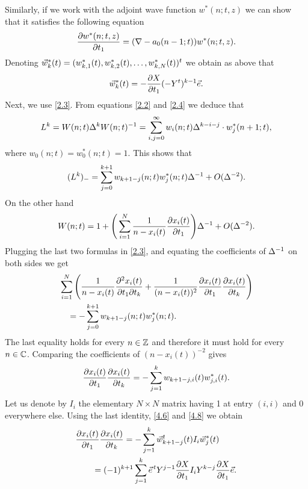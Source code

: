 \documentclass[11pt,reqno]{amsart}
\theoremstyle{definition}
\numberwithin{equation}{section}
\begin{document}
Similarly, if we work with the adjoint wave function $w^*(n;t,z)$ we 
can show that it satisfies the following equation
\begin{equation*}
\frac{\partial w^*(n;t,z)}{\partial t_1}=(\nabla-a_0(n-1;t))w^*(n;t,z).
\end{equation*}
Denoting ${\vec{w}}^*_k(t)=(w^*_{k,1}(t),w^*_{k,2}(t),\dots,w^*_{k,N}(t))^t$ we 
obtain as above that 
\begin{equation}                                             \label{4.8}
{\vec{w}}^*_k(t)=-\frac{\partial X}{\partial t_1}(-Y^t)^{k-1}{\vec{e}}.
\end{equation}
Next, we use \eqref{2.3}. From equations \eqref{2.2} and \eqref{2.4} we deduce 
that
\begin{equation*}
L^k=W(n;t)\Delta^k W(n;t)^{-1}
=\sum_{i,j=0}^{\infty}w_i(n;t)\Delta^{k-i-j}\cdot w^*_j(n+1;t),
\end{equation*}
where $w_0(n;t)=w^*_0(n;t)=1$. This shows that 
\begin{equation*}
(L^k)_-=\sum_{j=0}^{k+1}w_{k+1-j}(n;t)w^*_{j}(n;t)\Delta^{-1}+O(\Delta^{-2}).
\end{equation*}
On the other hand 
\begin{equation*}
W(n;t)=1+\Bigg(\sum_{i=1}^N\frac{1}{n-x_i(t)}\frac{\partial x_i(t)}{\partial t_1}\Bigg)
\Delta^{-1}+O(\Delta^{-2}).
\end{equation*}
Plugging the last two formulas in \eqref{2.3}, and 
equating the coefficients of $\Delta^{-1}$ on both sides we get
\begin{align*}
&\sum_{i=1}^N\Bigg(\frac{1}{n-x_i(t)}\frac{\partial^2 x_i(t)}{\partial t_1\partial t_k}
+\frac{1}{(n-x_i(t))^2}\frac{\partial x_i(t)}{\partial t_1}\frac{\partial x_i(t)}{\partial t_k}
\Bigg) \\
&\quad =-\sum_{j=0}^{k+1}w_{k+1-j}(n;t)w^*_{j}(n;t).
\end{align*}
The last equality holds for every $n\in\mathbb Z$ and therefore it must hold for 
every $n\in \mathbb C$. Comparing the coefficients of $(n-x_i(t))^{-2}$ gives
\begin{equation*}
\frac{\partial x_i(t)}{\partial t_1}\frac{\partial x_i(t)}{\partial t_k} =
-\sum_{j=1}^{k}w_{k+1-j,i}(t)w^*_{j,i}(t).
\end{equation*}
Let us denote by $I_i$ the elementary $N\times N$ matrix having 1 at entry 
$(i,i)$ and $0$ everywhere else. Using the last identity, \eqref{4.6} and 
\eqref{4.8} we obtain 
\begin{align*}
&\frac{\partial x_i(t)}{\partial t_1}\frac{\partial x_i(t)}{\partial t_k} =
-\sum_{j=1}^{k}{\vec{w}}_{k+1-j}^t(t)I_i{\vec{w}}^*_{j}(t)\\
&\qquad =(-1)^{k+1}\sum_{j=1}^k {\vec{e}}^{\,t} Y^{j-1}\frac{\partial X}{\partial t_1} 
I_i Y^{k-j}\frac{\partial X}{\partial t_1}{\vec{e}} .
\end{align*}
\end{document}
